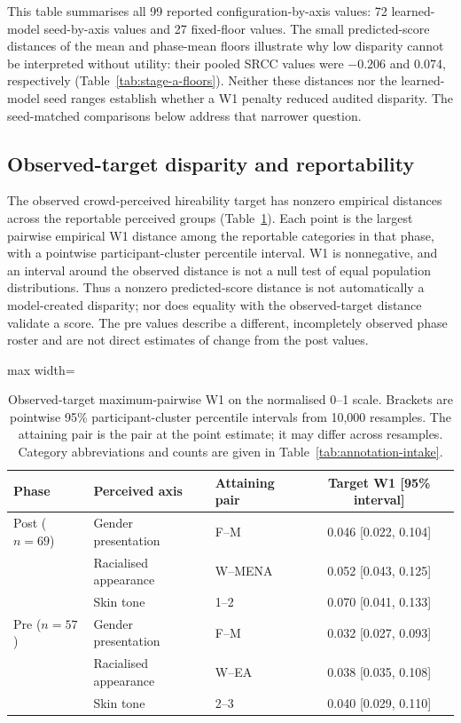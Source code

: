 This table summarises all 99 reported configuration-by-axis values: 72 learned-model
seed-by-axis values and 27 fixed-floor values. The small predicted-score distances of the mean and
phase-mean floors illustrate why low disparity cannot be interpreted without utility: their
pooled SRCC values were $-0.206$ and 0.074, respectively
(Table~\ref{tab:stage-a-floors}). Neither these distances nor the learned-model seed ranges
establish whether a W1 penalty reduced audited disparity. The seed-matched comparisons below
address that narrower question.

\subsection{Observed-target disparity and reportability}

The observed crowd-perceived hireability target has nonzero empirical distances across the
reportable perceived groups
(Table~\ref{tab:stage-c-observed-target}). Each point is the largest pairwise empirical W1
distance among the reportable categories in that phase, with a pointwise participant-cluster
percentile interval. W1 is nonnegative, and an interval around the observed distance is not a
null test of equal population distributions. Thus a nonzero predicted-score distance is not
automatically a model-created disparity; nor does equality with the observed-target distance
validate a score.
The pre values describe a different, incompletely observed phase roster and are not direct
estimates of change from the post values.

\begin{table}[htbp]
\centering
\caption[Observed-target disparity by phase and perceived axis]{Observed-target maximum-pairwise W1 on the normalised 0--1 scale. Brackets are pointwise
95\% participant-cluster percentile intervals from 10,000 resamples. The attaining pair is the
pair at the point estimate; it may differ across resamples. Category abbreviations and counts
are given in Table~\ref{tab:annotation-intake}.}
\label{tab:stage-c-observed-target}
\small
\begin{adjustbox}{max width=\textwidth}
\begin{tabular}{lllc}
\toprule
Phase & Perceived axis & Attaining pair & Target W1 [95\% interval] \\
\midrule
Post ($n=69$) & Gender presentation & F--M & 0.046 [0.022, 0.104] \\
 & Racialised appearance & W--MENA & 0.052 [0.043, 0.125] \\
 & Skin tone & 1--2 & 0.070 [0.041, 0.133] \\
\midrule
Pre ($n=57$) & Gender presentation & F--M & 0.032 [0.027, 0.093] \\
 & Racialised appearance & W--EA & 0.038 [0.035, 0.108] \\
 & Skin tone & 2--3 & 0.040 [0.029, 0.110] \\
\bottomrule
\end{tabular}
\end{adjustbox}
\end{table}
\FloatBarrier

